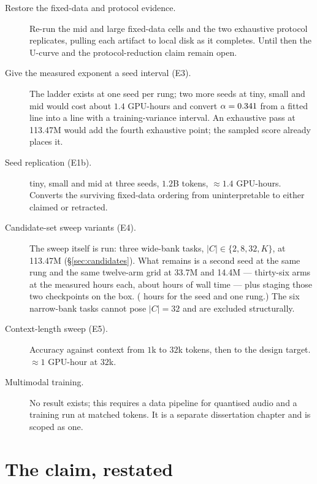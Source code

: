 \begin{description}
  \item[Restore the fixed-data and protocol evidence.] Re-run the mid and large
  fixed-data cells and the two exhaustive protocol replicates, pulling each
  artifact to local disk as it completes. Until then the U-curve and the
  protocol-reduction claim remain open.
  \item[Give the measured exponent a seed interval (E3).] The ladder exists at
  one seed per rung; two more seeds at tiny, small and mid would cost about
  $1.4$ GPU-hours and convert $\alpha = 0.341$ from a fitted line into a
  line with a training-variance interval. An exhaustive pass at 113.47M would
  add the fourth exhaustive point; the sampled score already places it.
  \item[Seed replication (E1b).] tiny, small and mid at three seeds, $1.2$B tokens,
  $\approx 1.4$ GPU-hours. Converts the surviving fixed-data ordering from
  uninterpretable to either claimed or retracted.
  \item[Candidate-set sweep variants (E4).] The sweep itself is run: three wide-bank
  tasks, $|C| \in \{2,8,32,K\}$, at 113.47M (\S\ref{sec:candidates}). What remains
  is a second seed at the same rung and the same twelve-arm grid at 33.7M and
  14.4M --- thirty-six arms at the measured \EArmHours{} hours each, about
  \EFutureBothHours{} hours of wall time --- plus staging those two checkpoints on
  the box. (\EFutureHours{} hours for the seed and one rung.) The six narrow-bank
  tasks cannot pose $|C|=32$ and are excluded structurally.
  \item[Context-length sweep (E5).] Accuracy against context from $1$k to $32$k
  tokens, then to the design target. $\approx 1$ GPU-hour at $32$k.
  \item[Multimodal training.] No result exists; this requires a data pipeline for
  quantised audio and a training run at matched tokens. It is a separate
  dissertation chapter and is scoped as one.
\end{description}

\section{The claim, restated}

